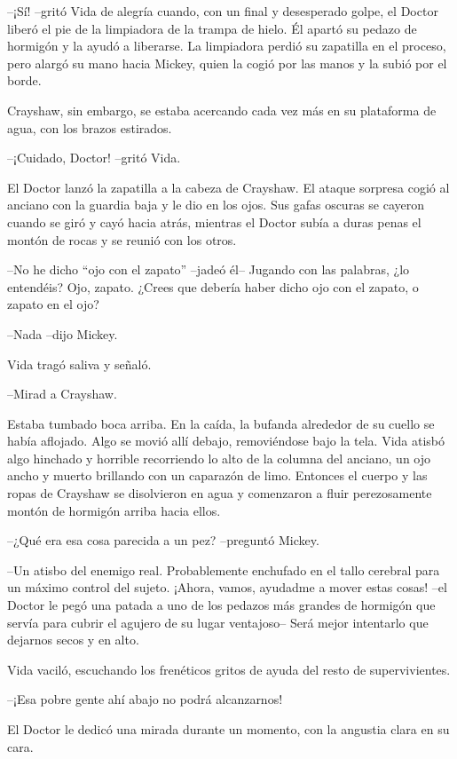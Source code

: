 \mbox{}

{--¡Sí! --gritó Vida de alegría cuando, con un final y desesperado
 golpe, el Doctor liberó el pie de la limpiadora de la trampa de hielo.
 Él apartó su pedazo de hormigón y la ayudó a liberarse. La limpiadora
 perdió su zapatilla en el proceso, pero alargó su mano hacia Mickey,
quien la cogió por las manos y la subió por el borde.}

{Crayshaw, sin embargo, se estaba acercando cada vez más en su
plataforma de agua, con los brazos estirados.}

{--¡Cuidado, Doctor! --gritó Vida.}

{El Doctor lanzó la zapatilla a la cabeza de Crayshaw. El ataque
 sorpresa cogió al anciano con la guardia baja y le dio en los ojos. Sus
 gafas oscuras se cayeron cuando se giró y cayó hacia atrás, mientras el
 Doctor subía a duras penas el montón de rocas y se reunió con los
otros.}

{--No he dicho ``ojo con el zapato'' --jadeó él-- Jugando con las
 palabras, ¿lo entendéis? Ojo, zapato. ¿Crees que debería haber dicho ojo
con el zapato, o zapato en el ojo?}

{--Nada --dijo Mickey.}

{Vida tragó saliva y señaló.}

{--Mirad a Crayshaw.}

{Estaba tumbado boca arriba. En la caída, la bufanda alrededor de su
 cuello se había aflojado. Algo se movió allí debajo, removiéndose bajo
 la tela. Vida atisbó algo hinchado y horrible recorriendo lo alto de la
 columna del anciano, un ojo ancho y muerto brillando con un caparazón de
 limo. Entonces el cuerpo y las ropas de Crayshaw se disolvieron en agua
 y comenzaron a fluir perezosamente montón de hormigón arriba hacia
ellos.}

{--¿Qué era esa cosa parecida a un pez? --preguntó Mickey.}

{--Un atisbo del enemigo real. Probablemente enchufado en el tallo
 cerebral para un máximo control del sujeto. ¡Ahora, vamos, ayudadme a
 mover estas cosas! --el Doctor le pegó una patada a uno de los pedazos
 más grandes de hormigón que servía para cubrir el agujero de su lugar
ventajoso-- Será mejor intentarlo que dejarnos secos y en alto.}

{Vida vaciló, escuchando los frenéticos gritos de ayuda del resto de
supervivientes.}

{--¡Esa pobre gente ahí abajo no podrá alcanzarnos!}

{El Doctor le dedicó una mirada durante un momento, con la angustia
clara en su cara.}

